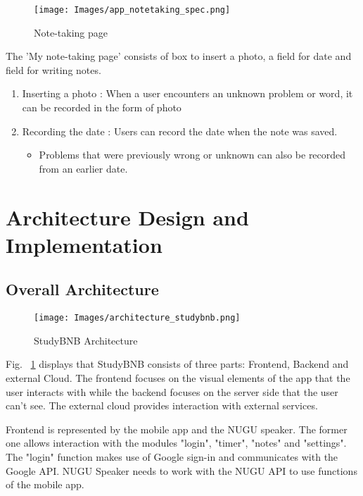 \documentclass[conference]{IEEEtran}
\begin{document}
\begin{figure}[htp]
    \centering
    \texttt{[image: Images/app\_notetaking\_spec.png]}
    \caption{Note-taking page}
\end{figure}

The 'My note-taking page' consists of box to insert a photo, a field for date and field for writing notes.

\begin{enumerate}
    \item Inserting a photo : When a user encounters an unknown problem or word, it can be recorded in the form of photo
    \item Recording the date : Users can record the date when the note was saved.
    \begin{itemize}
        \item Problems that were previously wrong or unknown can also be recorded from an earlier date.
    \end{itemize}
\end{enumerate}


\section{Architecture Design and Implementation}

\subsection{Overall Architecture}

\begin{figure}[H]
    \centering
    \texttt{[image: Images/architecture\_studybnb.png]}
    \caption{StudyBNB Architecture}
    \label{figure:architecture}
\end{figure}

Fig. ~\ref{figure:architecture} displays that StudyBNB consists of three parts: Frontend, Backend and external Cloud. The frontend focuses on the visual elements of the app that the user interacts with while the backend focuses on the server side that the user can't see. The external cloud provides interaction with external services.

Frontend is represented by the mobile app and the NUGU speaker. The former one allows interaction with the modules "login", "timer", "notes" and "settings". The "login" function makes use of Google sign-in and communicates with the Google API. NUGU Speaker needs to work with the NUGU API to use functions of the mobile app.
\end{document}

